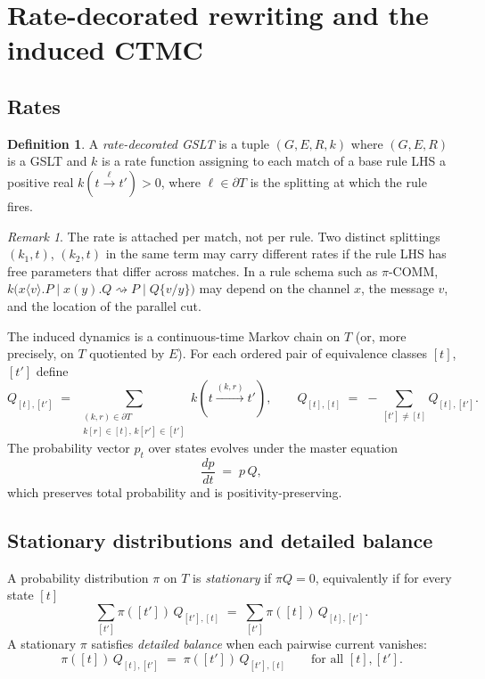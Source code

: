 \documentclass[11pt]{article}
\theoremstyle{plain}
\theoremstyle{definition}
\newtheorem{definition}[theorem]{Definition}
\theoremstyle{remark}
\newtheorem{remark}[theorem]{Remark}
\newcommand{\rew}{\rightsquigarrow}
\newcommand{\bd}{\partial}
\begin{document}
\section{Rate-decorated rewriting and the induced CTMC}\label{sec:ctmc}

\subsection{Rates}

\begin{definition}\label{def:rated-gslt}
A \emph{rate-decorated GSLT} is a tuple $(G, E, R, k)$ where $(G, E, R)$ is a GSLT and $k$ is a rate function assigning to each match of a base rule LHS a positive real $k(t \xrightarrow{\ell} t') > 0$, where $\ell \in \bd T$ is the splitting at which the rule fires.
\end{definition}

\begin{remark}
The rate is attached per match, not per rule. Two distinct splittings $(k_1, t)$, $(k_2, t)$ in the same term may carry different rates if the rule LHS has free parameters that differ across matches. In a rule schema such as $\pi$-COMM, $k\bigl(x\langle v\rangle.P \mid x(y).Q \rew P \mid Q\{v/y\}\bigr)$ may depend on the channel $x$, the message $v$, and the location of the parallel cut.
\end{remark}

The induced dynamics is a continuous-time Markov chain on $T$ (or, more precisely, on $T$ quotiented by $E$). For each ordered pair of equivalence classes $[t]$, $[t']$ define
\[
Q_{[t],[t']} \;=\; \sum_{\substack{(k,r) \in \bd T \\ k[r] \in [t],\, k[r'] \in [t']}} k(t \xrightarrow{(k,r)} t'),
\qquad
Q_{[t],[t]} \;=\; -\sum_{[t'] \neq [t]} Q_{[t],[t']}.
\]
The probability vector $p_t$ over states evolves under the master equation
\begin{equation}\label{eq:master}
\frac{d p}{dt} \;=\; p \, Q,
\end{equation}
which preserves total probability and is positivity-preserving.

\subsection{Stationary distributions and detailed balance}

A probability distribution $\pi$ on $T$ is \emph{stationary} if $\pi Q = 0$, equivalently if for every state $[t]$
\[
\sum_{[t']} \pi([t'])\, Q_{[t'],[t]} \;=\; \sum_{[t']} \pi([t])\, Q_{[t],[t']}.
\]
A stationary $\pi$ satisfies \emph{detailed balance} when each pairwise current vanishes:
\begin{equation}\label{eq:db}
\pi([t])\, Q_{[t],[t']} \;=\; \pi([t'])\, Q_{[t'],[t]} \qquad \text{for all } [t], [t'].
\end{equation}
\end{document}
